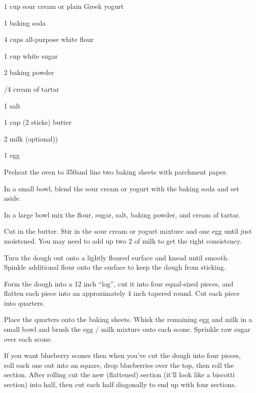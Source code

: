 \begin{IngredientsAndSteps}
    \ListIngredientsAndSteps
    {
        1 cup sour cream or plain Greek yogurt

        1 \tsp baking soda

        4 cups all-purpose white flour

        1 cup white sugar

        2 \tsp[s] baking powder

        /4 \tsp cream of tartar

        1 \tsp salt

        1 cup (2 sticks) butter

        2 \Tbl[s] milk (optional))

        1 egg
    }
    {
        Preheat the oven to 350\Degrees[F] and line two baking sheets with parchment paper.

        In a small bowl, blend the sour cream or yogurt with the baking soda and set aside.

        In a large bowl mix the flour, sugar, salt, baking powder, and cream of tartar.

        Cut in the butter. Stir in the sour cream or yogurt mixture and one egg until just moistened.
        You may need to add up two 2 \Tbl[s] of milk to get the right consistency.

        Turn the dough out onto a lightly floured surface and knead until smooth. Spinkle additional
        flour onto the surface to keep the dough from sticking.

        Form the dough into a 12 inch ``log'', cut it into four equal-sized pieces, and flatten
        each piece into an approximately 4 inch tapered round. Cut each piece into quarters.

        Place the quarters onto the baking sheets. Whisk the remaining egg and milk in a small bowl
        and brush the egg / milk mixture onto each scone. Sprinkle raw sugar over each scone.
    }

    {}
\end{IngredientsAndSteps}


\begin{Tip}
    {
        If you want blueberry scones then when you've cut the dough into four pieces, roll each
        one out into an  square, drop blueberries over the top, then roll the
        section. After rolling cut the new (flattened) section (it'll look like a biscotti section)
        into half, then cut each half diagonally to end up with four sections.
    }
\end{Tip}


